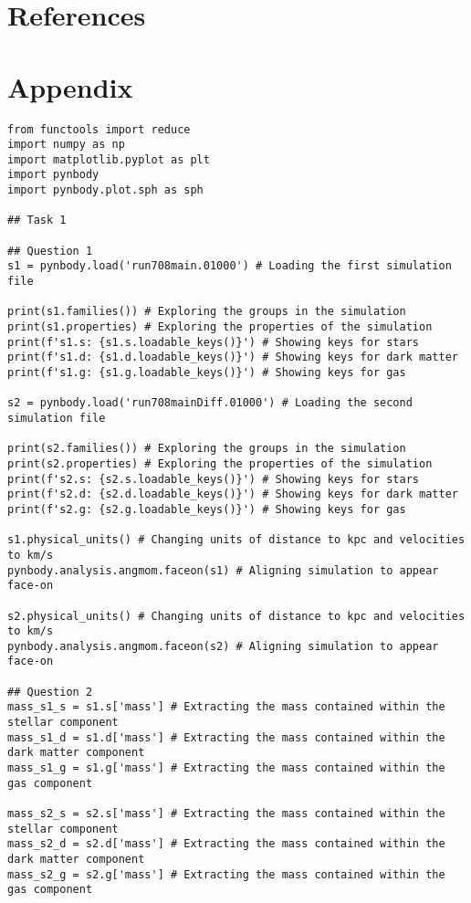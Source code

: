 \documentclass[12pt, a4paper]{article}
\begin{document}
\section{References}
\printbibliography[heading = none]

\section{Appendix}
\begin{lstlisting}[language=iPython]
from functools import reduce
import numpy as np
import matplotlib.pyplot as plt
import pynbody
import pynbody.plot.sph as sph

## Task 1

## Question 1
s1 = pynbody.load('run708main.01000') # Loading the first simulation file

print(s1.families()) # Exploring the groups in the simulation
print(s1.properties) # Exploring the properties of the simulation
print(f's1.s: {s1.s.loadable_keys()}') # Showing keys for stars
print(f's1.d: {s1.d.loadable_keys()}') # Showing keys for dark matter
print(f's1.g: {s1.g.loadable_keys()}') # Showing keys for gas

s2 = pynbody.load('run708mainDiff.01000') # Loading the second simulation file

print(s2.families()) # Exploring the groups in the simulation
print(s2.properties) # Exploring the properties of the simulation
print(f's2.s: {s2.s.loadable_keys()}') # Showing keys for stars
print(f's2.d: {s2.d.loadable_keys()}') # Showing keys for dark matter
print(f's2.g: {s2.g.loadable_keys()}') # Showing keys for gas

s1.physical_units() # Changing units of distance to kpc and velocities to km/s
pynbody.analysis.angmom.faceon(s1) # Aligning simulation to appear face-on

s2.physical_units() # Changing units of distance to kpc and velocities to km/s
pynbody.analysis.angmom.faceon(s2) # Aligning simulation to appear face-on

## Question 2
mass_s1_s = s1.s['mass'] # Extracting the mass contained within the stellar component
mass_s1_d = s1.d['mass'] # Extracting the mass contained within the dark matter component
mass_s1_g = s1.g['mass'] # Extracting the mass contained within the gas component

mass_s2_s = s2.s['mass'] # Extracting the mass contained within the stellar component
mass_s2_d = s2.d['mass'] # Extracting the mass contained within the dark matter component
mass_s2_g = s2.g['mass'] # Extracting the mass contained within the gas component


\end{lstlisting}
\end{document}

